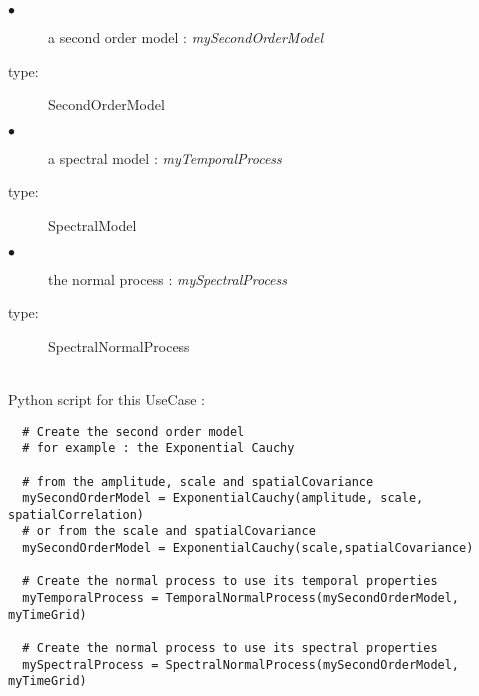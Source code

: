 {

  \begin{description}
  \item[$\bullet$] a second order model : {\itshape mySecondOrderModel }
  \item[type:] SecondOrderModel
  \end{description}

  \begin{description}
  \item[$\bullet$] a spectral model : {\itshape myTemporalProcess}
  \item[type:] SpectralModel
  \end{description}

  \begin{description}
  \item[$\bullet$] the normal process : {\itshape mySpectralProcess}
  \item[type:]  SpectralNormalProcess 
  \end{description}

}

\textspace\\
Python script for this UseCase :

\begin{lstlisting}
  # Create the second order model
  # for example : the Exponential Cauchy

  # from the amplitude, scale and spatialCovariance
  mySecondOrderModel = ExponentialCauchy(amplitude, scale, spatialCorrelation)
  # or from the scale and spatialCovariance
  mySecondOrderModel = ExponentialCauchy(scale,spatialCovariance)
 
  # Create the normal process to use its temporal properties
  myTemporalProcess = TemporalNormalProcess(mySecondOrderModel, myTimeGrid)
 
  # Create the normal process to use its spectral properties
  mySpectralProcess = SpectralNormalProcess(mySecondOrderModel, myTimeGrid)
\end{lstlisting}



